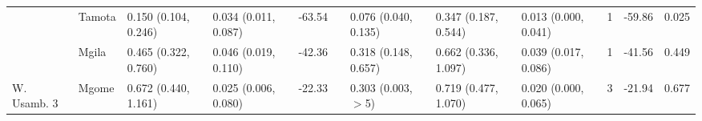 \begin{tabular}{lllllllllclr}
            & Tamota         & 0.150 (0.104, 0.246)   & 0.034 (0.011, 0.087)   & -63.54   & &  0.076   (0.040, 0.135)   & 0.347 (0.187, 0.544)   & 0.013 (0.000, 0.041)   & 1    & -59.86   & 0.025\\
            & Mgila          & 0.465 (0.322, 0.760)   & 0.046 (0.019, 0.110)   & -42.36   & &  0.318   (0.148, 0.657)   & 0.662 (0.336, 1.097)   & 0.039 (0.017, 0.086)   & 1    & -41.56   & 0.449\\
\cmidrule{2-12}
W. Usamb. 3 & Mgome          & 0.672 (0.440, 1.161)   & 0.025 (0.006, 0.080)   & -22.33   & &  0.303   (0.003, $>$5)    & 0.719 (0.477, 1.070)   & 0.020 (0.000, 0.065)   & 3    & -21.94   & 0.677\\
\bottomrule
\end{tabular}